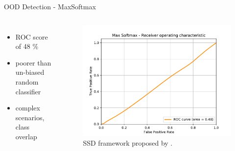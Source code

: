 \documentclass[10pt, aspectratio=169]{beamer}
\begin{document}
\begin{frame}{OOD Detection - MaxSoftmax}
    \begin{columns}
            \begin{itemize}
                \item ROC score of 48 \%
                \item poorer than un-biased random classifier
                \item complex scenarios, class overlap
            \end{itemize}
            \begin{figure}[!ht]
                \centering
                \includegraphics[scale=0.45]{images/Max Softmax_ROC.pdf}
                \caption[SSD framework]{SSD framework proposed by \citet[p. 24]{Liu2016SSDSS}.}
            \end{figure}
    \end{columns}
\end{frame}
\end{document}
